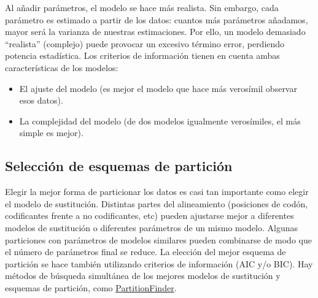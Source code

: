 Al añadir parámetros, el modelo se hace más realista. Sin embargo, cada parámetro es estimado a partir de los datos: cuantos más parámetros añadamos, mayor será la varianza de nuestras estimaciones. Por ello, un modelo demasiado “realista” (complejo) puede provocar un excesivo término error, perdiendo potencia estadística. Los criterios de información tienen en cuenta ambas características de los modelos: \begin{itemize}
\item El ajuste del modelo (es mejor el modelo que hace más verosímil observar esos datos).
\item La complejidad del modelo (de dos modelos igualmente verosímiles, el más simple es mejor).
\end{itemize}

\subsection{Selección de esquemas de partición}
Elegir la mejor forma de particionar los datos es casi tan importante como elegir el modelo de sustitución. Distintas partes del alineamiento (posiciones de codón, codificantes frente a no codificantes, etc) pueden ajustarse mejor a diferentes modelos de sustitución o diferentes parámetros de un mismo modelo. Algunas particiones con parámetros de modelos similares pueden combinarse de modo que el número de parámetros final se reduce. La elección del mejor esquema de partición se hace también utilizando criterios de información (AIC y/o BIC). Hay métodos de búsqueda simultánea de los mejores modelos de sustitución y esquemas de partición, como \href{http://www.robertlanfear.com/partitionfinder/}{PartitionFinder}.
